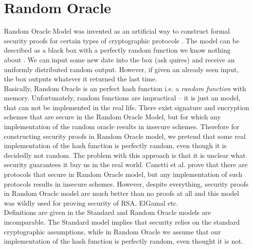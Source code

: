 \section{Random Oracle}
\label{rom}
Random Oracle Model was invented as an artificial  way to construct formal security proofs for certain types of cryptographic protocols \cite{Bellare1993}. The model can be described as a black box with a perfectly random function we know nothing about . We can input some new date into the box (ask quires) and receive an uniformly distributed random output. However, if given an already seen input, the box outputs whatever it returned the last time. \\

Basically, Random Oracle is an perfect hash function i.e. a \textit{random function} with memory. Unfortunately, random functions are impractical -- it is just an model, that can not be implemented in the real life. There exist signature and encryption schemes that are secure in the Random Oracle Model, but for which any implementation of the random oracle results in insecure schemes. Therefore for constructing security proofs in Random Oracle model, we pretend that some real implementation of the hash function is perfectly random, even though it is decidedly not random. The problem with this approach is that it is unclear what security guarantees it buy us in the real world. Canetti et al. \cite{Canetti2004} prove that there are protocols that secure in Random Oracle model, but any implementation of such protocols results in insecure schemes. However, despite everything, security proofs in Random Oracle model are much better than no proofs at all and this model was wildly used for proving security of RSA, ElGamal etc.\\

Definitions are given in the Standard and Random Oracle models are incomparable. The Standard model implies that security relies on the standard cryptographic assumptions, while in Random Oracle we assume that our implementation of the hash function is perfectly random, even thought it is not. 